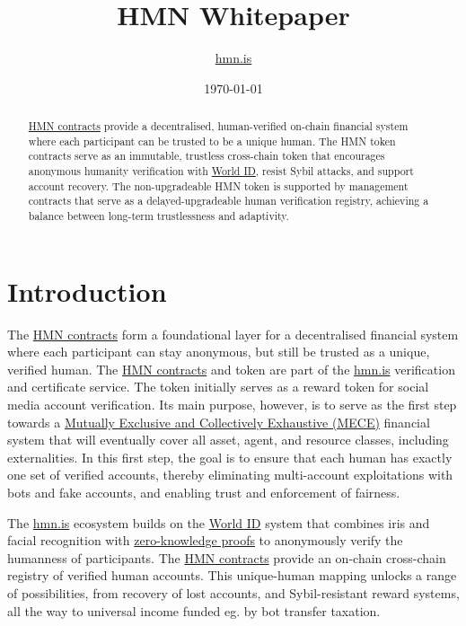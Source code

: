 \documentclass[12pt,a4paper]{article}
\title{HMN Whitepaper}
\author{\href{https://hmn.is}{hmn.is}}
\date{\today}
\begin{document}
\maketitle

\begin{abstract}
\href{https://github.com/hmn-is/hmn-contracts}{HMN contracts} provide a decentralised, human-verified on-chain financial system where each participant can be trusted to be a unique human.
The HMN token contracts serve as an immutable, trustless cross-chain token that encourages anonymous humanity verification with \href{https://world.org/world-id}{World ID}, resist Sybil attacks, and support account recovery.
The non-upgradeable HMN token is supported by management contracts that serve as a delayed-upgradeable human verification registry, achieving a balance between long-term trustlessness and adaptivity.
\end{abstract}

\section{Introduction}
The \href{https://github.com/hmn-is/hmn-contracts}{HMN contracts} form a foundational layer for a decentralised financial system where each participant can stay anonymous, but still be trusted as a unique, verified human.
The \href{https://github.com/hmn-is/hmn-contracts}{HMN contracts} and token are part of the \href{https://hmn.is}{hmn.is} verification and certificate service. The token initially serves as a reward token for social media account verification.
Its main purpose, however, is to serve as the first step towards a \href{https://en.wikipedia.org/wiki/MECE_principle}{Mutually Exclusive and Collectively Exhaustive (MECE)} financial system that will eventually cover all asset, agent, and resource classes, including externalities.
In this first step, the goal is to ensure that each human has exactly one set of verified accounts, thereby eliminating multi-account exploitations with bots and fake accounts, and enabling trust and enforcement of fairness.

The \href{https://hmn.is}{hmn.is} ecosystem builds on the \href{https://world.org/world-id}{World ID} system that combines iris and facial recognition with \href{https://en.wikipedia.org/wiki/Zero-knowledge_proof}{zero-knowledge proofs} to anonymously verify the humanness of participants.
The \href{https://github.com/hmn-is/hmn-contracts}{HMN contracts} provide an on-chain cross-chain registry of verified human accounts.
This unique-human mapping unlocks a range of possibilities, from recovery of lost accounts, and Sybil-resistant reward systems, all the way to universal income funded eg. by bot transfer taxation.
\end{document}
